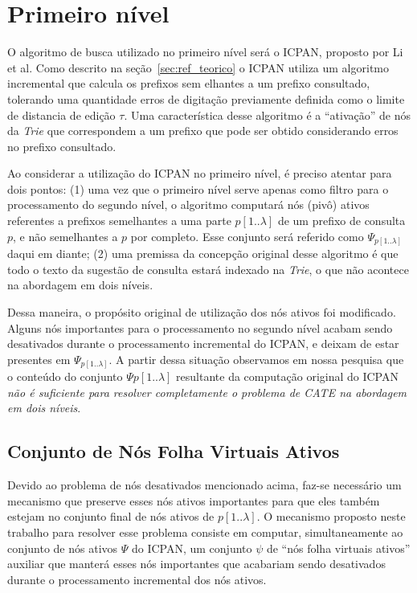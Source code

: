 \section{Primeiro nível}
\label{sec:first-level}

O algoritmo de busca utilizado no primeiro nível será o ICPAN, proposto por Li et al. Como descrito na seção~\ref{sec:ref_teorico} o ICPAN utiliza um algoritmo incremental que calcula os prefixos sem elhantes a um prefixo consultado, tolerando uma quantidade erros de digitação previamente definida como o limite de distancia de edição $\tau$. Uma característica desse algoritmo é a ``ativação'' de nós da \textit{Trie} que correspondem a um prefixo que pode ser obtido considerando erros no prefixo consultado.

Ao considerar a utilização do ICPAN no primeiro nível, é preciso atentar para dois pontos: (1) uma vez que o primeiro nível serve apenas como filtro para o processamento do segundo nível, o algoritmo computará nós (pivô) ativos referentes a prefixos semelhantes a uma parte $p[1..\lambda]$ de um prefixo de consulta $p$, e não semelhantes a $p$ por completo. Esse conjunto será referido como $\Psi_{p[1..\lambda]}$ daqui em diante; (2) uma premissa da concepção original desse algoritmo é que todo o texto da sugestão de consulta estará indexado na \textit{Trie}, o que não acontece na abordagem em dois níveis.

Dessa maneira, o propósito original de utilização dos nós ativos foi modificado. Alguns nós importantes para o processamento no segundo nível acabam sendo desativados durante o processamento incremental do ICPAN, e deixam de estar presentes em $\Psi_{p[1..\lambda]}$. A partir dessa situação observamos em nossa pesquisa que o conteúdo do conjunto $\Psi{p[1..\lambda]}$ resultante da computação original do ICPAN \textit{não é suficiente para resolver completamente o problema de CATE na abordagem em dois níveis}. 

\subsection{Conjunto de Nós Folha Virtuais Ativos}
\label{sec:virtual_leaves_node-set}

Devido ao problema de nós desativados mencionado acima, faz-se necessário um mecanismo que preserve esses nós ativos importantes para que eles também estejam no conjunto final de nós ativos de $p[1..\lambda]$. O mecanismo proposto neste trabalho para resolver esse problema consiste em computar, simultaneamente ao conjunto de nós ativos $\Psi$ do ICPAN, um conjunto $\psi$ de ``nós folha virtuais ativos'' auxiliar que manterá esses nós importantes que acabariam sendo desativados durante o processamento incremental dos nós ativos. 

